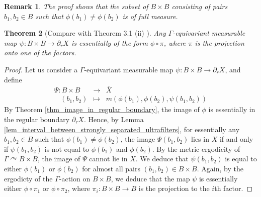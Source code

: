 \documentclass{amsart}
\numberwithin{equation}{section}
\newtheorem{thm}{Theorem}[section]
\newtheorem{rmk}[thm]{Remark}
\theoremstyle{definition}
\def\bar{\overline}
\begin{document}
\begin{rmk}
    The proof shows that the subset of $B\times B$ consisting of pairs $b_1,b_2\in B$ such that $\phi(b_1)\neq\phi(b_2)$ is of full measure. 
\end{rmk}
\begin{thm}[Compare with Theorem 3.1 (ii) \cite{BCFS}]\label{thm_unicity_of_boundary_map_product}
Any $\Gamma$-equivariant measurable map $\psi: B\times B \rightarrow \partial_r X$ is essentially of the form $\phi\circ \pi$, where $\pi$ is the projection onto one of the factors.
\end{thm}
\begin{proof}
    Let us consider a $\Gamma$-equivariant measurable map $\psi: B\times B \rightarrow \partial_r X$, and define 
    \begin{eqnarray*}
\Psi: B\times B &\rightarrow & \bar{X}\\
\ \ \ \ (b_1,b_2) &\mapsto & m(\phi(b_1),\phi(b_2),\psi(b_1,b_2))
\end{eqnarray*}
    By Theorem \ref{thm_image_in_regular_boundary}, the image of $\phi$ is essentially in the regular boundary $\partial_r X$. Hence, by Lemma \ref{lem_interval_between_strongly_separated_ultrafilters}, for essentially any $b_1,b_2\in B$ such that $\phi(b_1)\neq \phi(b_2)$, the image $\Psi(b_1,b_2)$ lies in $X$ if and only if $\psi(b_1,b_2)$ is not equal to $\phi(b_1)$ and $\phi(b_2)$. By the metric ergodicity of $\Gamma \curvearrowright B \times B$, the image of $\Psi$ cannot lie in $X$. We deduce that $\psi(b_1,b_2)$ is equal to either $\phi(b_1)$ or $\phi(b_2)$ for almost all pairs $(b_1,b_2)\in B \times B$. Again, by the ergodicty of the $\Gamma$-action on $B\times B$, we deduce that the map $\psi$ is essentially either $\phi\circ\pi_1$ or $\phi\circ\pi_2$, where $\pi_i: B \times B \to B$ is the projection to the $i$th factor.
 \end{proof}
\end{document}
